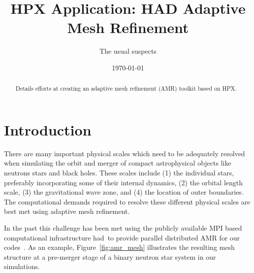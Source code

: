 \documentclass[prd,aps,showpacs,nofootinbib,floats,floatfix,twocolumn,letterpaper]{revtex4}
\newcommand{\had}{{\sc had}}
\begin{document}
\title{HPX Application: HAD Adaptive Mesh Refinement}

\author{The usual suspects} 



\date{\today}

%
%
\begin{abstract}
Details efforts at creating an adaptive mesh refinement (AMR) toolkit based on HPX.
\end{abstract}

\maketitle

%
%
\section{Introduction}
There are many important physical scales which need to be adequately resolved when
simulating the orbit and merger of compact astrophysical objects like neutrons stars
and black holes.  These scales include (1) the individual stars, preferably incorporating
some of their internal dynamics, (2) the orbital
length scale, (3) the gravitational wave zone, and (4) the
location of outer boundaries.  The computational demands
required to resolve these different physical scales are best met
using adaptive mesh refinement.

In the past this challenge has been met using the publicly available MPI based computational infrastructure
\had\ to provide parallel distributed
AMR for our codes~\cite{had_webpage,Liebling}.  As an example, 
Figure~\ref{fig:amr_mesh} illustrates the resulting mesh structure at a 
pre-merger stage of a binary neutron star system in our simulations.
\end{document}
